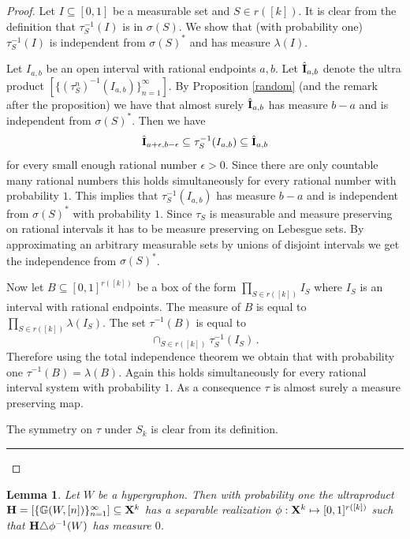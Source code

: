 \documentclass [11pt] {article}
\newcommand{\qed} {\hspace {0.1in} \rule {1.5mm} {3.5mm}}
\newtheorem{lemma}{Lemma}[section]
\def\bH{{\bf H}}
\def\xo{{\bf X}}
\begin{document}
\begin{proof}
Let $I\subseteq [0,1]$ be a measurable set and $S\in r([k])$. It is clear from
the definition that $\tau_S^{-1}(I)$ is in $\sigma(S)$. We show that 
(with probability one) $\tau_S^{-1}(I)$ is independent from $\sigma(S)^*$ 
and has measure $\lambda(I)$.

Let $I_{a,b}$ be an open interval with rational endpoints $a,b$. 
Let $\hat{\bf I}_{a,b}$ denote the ultra product
$[\{(\tau^n_S)^{-1}(I_{a,b})\}_{n=1}^\infty]$. By Proposition \ref{random}
(and the remark after the proposition)
we have that almost 
surely $\hat{\bf I}_{a,b}$ has measure $b-a$ and is independent 
from $\sigma(S)^*$.
Then we have 
$$\hat{\bf I}_{a+\epsilon,b-\epsilon}\subseteq\tau_S^{-1}(I_{a,b})
\subseteq\hat{\bf I}_{a,b}$$
for every small enough
 rational number $\epsilon>0$. Since there are only countable many
rational numbers this holds simultaneously for every rational 
number with probability $1$.
This implies that $\tau_S^{-1}(I_{a,b})$ has measure $b-a$ and is 
independent from $\sigma(S)^*$ with probability $1$. Since $\tau_S$ 
is measurable and measure preserving on rational intervals it has to be
measure preserving on Lebesgue sets. By approximating an arbitrary measurable
 sets by unions of disjoint intervals we get the independence 
from $\sigma(S)^*$.

Now let $B\subseteq [0,1]^{r([k])}$ be a box of the form 
$\prod_{S\in r([k])} I_S$ where $I_S$ is an interval with rational endpoints.
 The measure of $B$ is equal to $\prod_{S\in r([k])}\lambda(I_S)$. 
The set $\tau^{-1}(B)$ is equal to
$$\cap_{S\in r([k])}\tau_S^{-1}(I_S)\,.$$ Therefore using the total 
independence theorem we obtain that with probability one
$\tau^{-1}(B)=\lambda(B)$. Again this holds simultaneously for every rational
interval 
system with probability $1$. As a consequence $\tau$ is 
almost surely a measure preserving map.

The symmetry on $\tau$ under $S_k$ is clear from its definition.\qed
\end{proof}

\medskip

\begin{lemma}\label{randsep} Let $W$ be a hypergraphon. 
Then with probability one the ultraproduct \\
$\bH=[\{\mathbb{G}(W,[n])\}_{n=1}^\infty]\subseteq \xo^k$ has a separable
realization $\phi:\xo^k\mapsto [0,1]^{r([k])}$ such that 
$\bH\triangle\phi^{-1}(W)$ has measure $0$.
\end{lemma}
\end{document}
